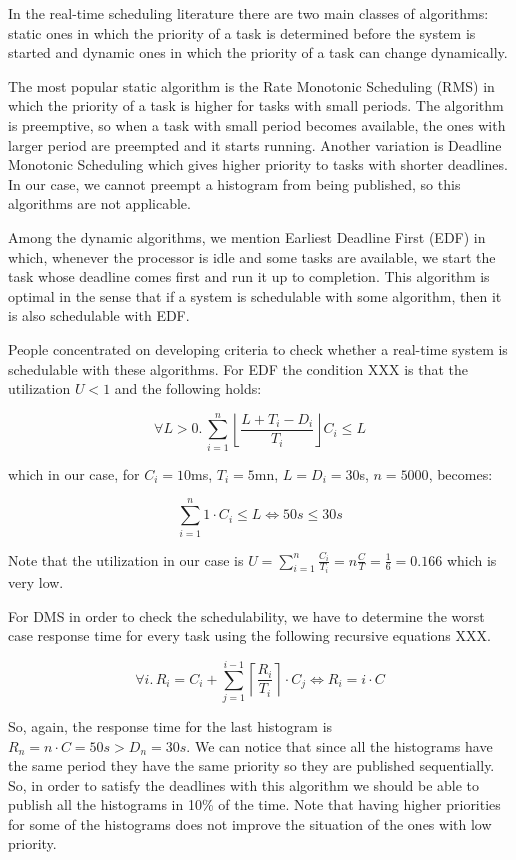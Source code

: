 In the real-time scheduling literature there are two main classes of algorithms: static ones in which the priority of a task is determined before the system is started and dynamic ones in which the priority of a task can change dynamically. 

The most popular static algorithm is the Rate Monotonic Scheduling (RMS) \citep{liu1973scheduling} in which the priority of a task is higher for tasks with small periods. The algorithm is preemptive, so when a task with small period becomes available, the ones with larger period are preempted and it starts running. Another variation is Deadline Monotonic Scheduling which gives higher priority to tasks with shorter deadlines. In our case, we cannot preempt a histogram from being published, so this algorithms are not applicable. 

Among the dynamic algorithms, we mention Earliest Deadline First (EDF) \citep{liu1973scheduling} in which, whenever the processor is idle and some tasks are available, we start the task whose deadline comes first and run it up to completion. This algorithm is optimal in the sense that if a system is schedulable with some algorithm, then it is also schedulable with EDF.

People concentrated on developing criteria to check whether a real-time system is schedulable with these algorithms. For EDF the condition XXX is that the utilization $U < 1$ and the following holds:

$$ \forall L > 0.\,  \sum_{i=1}^n \left\lfloor \frac{L+T_i-D_i}{T_i}\right\rfloor C_i \le L $$

which in our case, for $C_i=10$ms, $T_i=5$mn, $L=D_i=30$s, $n=5000$, becomes:

$$ \sum_{i=1}^n 1 \cdot C_i \le L \Leftrightarrow 50s \le 30s $$

Note that the utilization in our case is $U=\sum_{i=1}^n\frac{C_i}{T_i}=n\frac C T = \frac 1 6 = 0.166$ which is very low. 

For DMS in order to check the schedulability, we have to determine the worst case response time for every task using the following recursive equations XXX.

 $$ \forall i.\, R_i=C_i+\sum_{j=1}^{i-1} \left\lceil \frac{R_i}{T_i} \right\rceil \cdot C_j \Leftrightarrow R_i = i\cdot C$$
 
 So, again, the response time for the last histogram is $R_n=n\cdot C=50s >D_n=30s$. We can notice that since all the histograms have the same period they have the same priority so they are published sequentially. So, in order to satisfy the deadlines with this algorithm we should be able to publish all the histograms in 10\% of the time. Note that having higher priorities for some of the histograms does not improve the situation of the ones with low priority.

